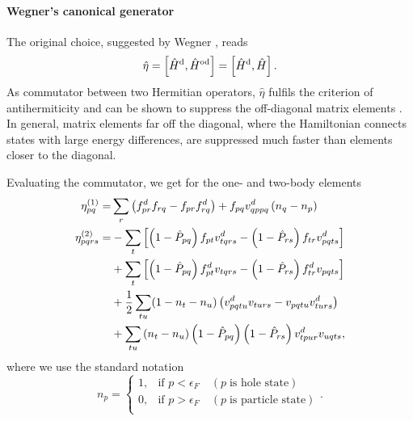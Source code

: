 \paragraph{Wegner's canonical generator}
The original choice, suggested by Wegner \cite{Wegner:1994dk}, reads
\begin{equation} 
\hat{\eta} = \left[ \hat{H}^{\rm d}, \hat{H}^{\rm od} \right] = \left[ \hat{H}^{\rm d}, \hat{H}
  \right].
\label{eq:etaWegner}
\end{equation} 
As commutator between two Hermitian operators, $\hat{\eta}$
fulfils the criterion of antihermiticity and can be shown to suppress
the off-diagonal matrix elements \cite{Kehrein:2006kx}. In general,
matrix elements far off the diagonal, where the Hamiltonian connects
states with large energy differences, are suppressed much faster than
elements closer to the diagonal. 

Evaluating the commutator, we get
for the one- and two-body elements
\begin{align*}
\eta_{pq}^{(1)} = & \sum_{r}\left(f_{pr}^d f_{rq} - f_{pr} f_{rq}^d \right)
+ f_{pq} v_{qppq}^d \left(n_q - n_p \right)\\ \eta_{pqrs}^{(2)} = & -
\sum_t \left[ \left(1-\hat{P}_{pq} \right)f_{pt} v_{tqrs}^d - \left(1 -
\hat{P}_{rs} \right)f_{tr} v_{pqts}^d \right] \notag \\ & + \sum_t
\left[  \left(1 - \hat{P}_{pq} \right)f_{pt}^d v_{tqrs} - \left(1 -
\hat{P}_{rs} \right)f_{tr}^d v_{pqts} \right]  \notag \\ & +
\frac{1}{2} \sum_{tu} (1 - n_t - n_u) \left(v_{pqtu}^d v_{turs} -
v_{pqtu} v_{turs}^d \right)\notag \\ & + \sum_{tu} \left(n_t - n_u \right)\left(
1 - \hat{P}_{pq} \right)\left(1 - \hat{P}_{rs} \right)v_{tpur}^d v_{uqts},
\end{align*}
where we use the standard notation
\[
n_p = \begin{cases} 1, & \mbox{if } p< \epsilon_F \quad(p\;\mbox{is
    hole state})\\ 0, &\mbox{if } p> \epsilon_F \quad(p\;\mbox{is
    particle state})\\
\end{cases}.
\]


